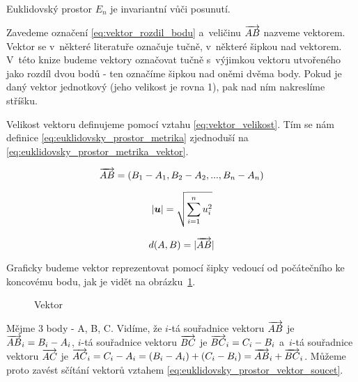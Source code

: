 \begin{fact}
Euklidovský prostor \(E_n\) je invariantní vůči posunutí.
\end{fact}

Zavedeme označení
\eqref{eq:vektor_rozdil_bodu} a~veličinu \(\overrightarrow{AB}\) nazveme vektorem. Vektor se v~některé literatuře označuje tučně, v~některé šipkou nad vektorem. V~této knize budeme vektory označovat tučně s~výjimkou vektoru
utvořeného jako rozdíl dvou bodů - ten označíme šipkou nad oněmi dvěma body. Pokud je daný vektor jednotkový (jeho velikost je rovna 1), pak nad ním
nakreslíme stříšku.

Velikost vektoru definujeme pomocí vztahu \eqref{eq:vektor_velikost}. Tím se nám definice \eqref{eq:euklidovsky_prostor_metrika} zjednoduší na \eqref{eq:euklidovsky_prostor_metrika_vektor}.

\begin{equation}
\label{eq:vektor_rozdil_bodu}
\overrightarrow{AB} = (B_1 - A_1, B_2 - A_2, ..., B_n - A_n)
\end{equation}

\begin{equation}
\label{eq:vektor_velikost}
|\boldsymbol{u}| = \sqrt{\sum_{i=1}^{n} u_i^2}
\end{equation}

\begin{equation}
\label{eq:euklidovsky_prostor_metrika_vektor}
d(A, B) = |\overrightarrow{AB}|
\end{equation}

Graficky budeme vektor reprezentovat pomocí šipky vedoucí od počátečního ke koncovému bodu, jak je vidět na obrázku~\ref{img:vektor_graficky}.

\begin{figure}[!h]
\centering
{}
\caption{Vektor}
\label{img:vektor_graficky}
\end{figure}

Mějme 3 body - A, B, C. Vidíme, že \(i\)-tá souřadnice vektoru \(\overrightarrow{AB}\) je \(\overrightarrow{AB}_i = B_i - A_i\), \(i\)-tá souřadnice vektoru \(\overrightarrow{BC}\) je \(\overrightarrow{BC}_i = C_i - B_i\) a~\(i\)-tá souřadnice vektoru \(\overrightarrow{AC}\) je \(\overrightarrow{AC}_i = C_i - A_i = (B_i - A_i) + (C_i - B_i) = \overrightarrow{AB}_i + \overrightarrow{BC}_i\). Můžeme proto zavést sčítání vektorů vztahem \eqref{eq:euklidovsky_prostor_vektor_soucet}.

